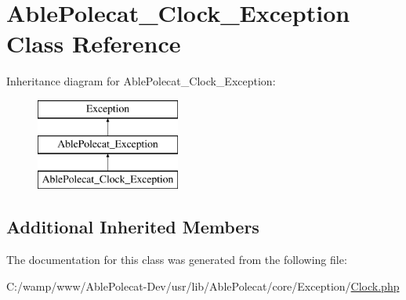 \hypertarget{class_able_polecat___clock___exception}{}\section{Able\+Polecat\+\_\+\+Clock\+\_\+\+Exception Class Reference}
\label{class_able_polecat___clock___exception}
Inheritance diagram for Able\+Polecat\+\_\+\+Clock\+\_\+\+Exception\+:\begin{figure}[H]
\begin{center}
\leavevmode
\includegraphics[height=3.000000cm]{class_able_polecat___clock___exception}
\end{center}
\end{figure}
\subsection*{Additional Inherited Members}


The documentation for this class was generated from the following file\+:\begin{DoxyCompactItemize}
\item 
C\+:/wamp/www/\+Able\+Polecat-\/\+Dev/usr/lib/\+Able\+Polecat/core/\+Exception/\hyperlink{_exception_2_clock_8php}{Clock.\+php}\end{DoxyCompactItemize}
